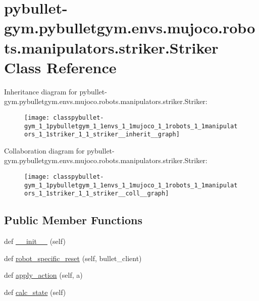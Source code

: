 \hypertarget{classpybullet-gym_1_1pybulletgym_1_1envs_1_1mujoco_1_1robots_1_1manipulators_1_1striker_1_1_striker}{}\section{pybullet-\/gym.pybulletgym.\+envs.\+mujoco.\+robots.\+manipulators.\+striker.\+Striker Class Reference}
\label{classpybullet-gym_1_1pybulletgym_1_1envs_1_1mujoco_1_1robots_1_1manipulators_1_1striker_1_1_striker}


Inheritance diagram for pybullet-\/gym.pybulletgym.\+envs.\+mujoco.\+robots.\+manipulators.\+striker.\+Striker\+:
\nopagebreak
\begin{figure}[H]
\begin{center}
\leavevmode
\texttt{[image: classpybullet-gym\_1\_1pybulletgym\_1\_1envs\_1\_1mujoco\_1\_1robots\_1\_1manipulators\_1\_1striker\_1\_1\_striker\_\_inherit\_\_graph]}
\end{center}
\end{figure}


Collaboration diagram for pybullet-\/gym.pybulletgym.\+envs.\+mujoco.\+robots.\+manipulators.\+striker.\+Striker\+:
\nopagebreak
\begin{figure}[H]
\begin{center}
\leavevmode
\texttt{[image: classpybullet-gym\_1\_1pybulletgym\_1\_1envs\_1\_1mujoco\_1\_1robots\_1\_1manipulators\_1\_1striker\_1\_1\_striker\_\_coll\_\_graph]}
\end{center}
\end{figure}
\subsection*{Public Member Functions}
\begin{DoxyCompactItemize}
\item 
def \hyperlink{classpybullet-gym_1_1pybulletgym_1_1envs_1_1mujoco_1_1robots_1_1manipulators_1_1striker_1_1_striker_aefec26ad7990fe46c987f96ea80a2128}{\+\_\+\+\_\+init\+\_\+\+\_\+} (self)
\item 
def \hyperlink{classpybullet-gym_1_1pybulletgym_1_1envs_1_1mujoco_1_1robots_1_1manipulators_1_1striker_1_1_striker_a21c33e6b4ebdf992f0f83fa8de9a1ec6}{robot\+\_\+specific\+\_\+reset} (self, bullet\+\_\+client)
\item 
def \hyperlink{classpybullet-gym_1_1pybulletgym_1_1envs_1_1mujoco_1_1robots_1_1manipulators_1_1striker_1_1_striker_acbc5fb6271ffe2cbc5814675c77094b3}{apply\+\_\+action} (self, a)
\item 
def \hyperlink{classpybullet-gym_1_1pybulletgym_1_1envs_1_1mujoco_1_1robots_1_1manipulators_1_1striker_1_1_striker_a5f183fcd9f5b04ab442caa1ee677eb0e}{calc\+\_\+state} (self)
\end{DoxyCompactItemize}
